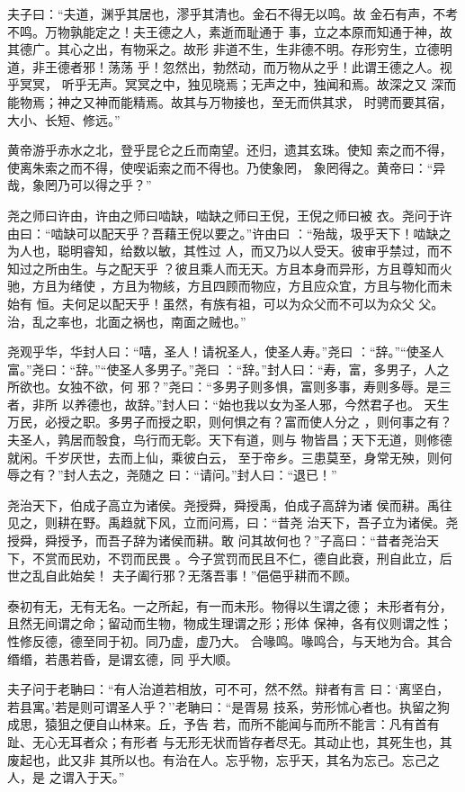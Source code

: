 \documentclass[]{article}
\begin{document}
夫子曰：``夫道，渊乎其居也，漻乎其清也。金石不得无以鸣。故
金石有声，不考不鸣。万物孰能定之！夫王德之人，素逝而耻通于
事，立之本原而知通于神，故其德广。其心之出，有物采之。故形
非道不生，生非德不明。存形穷生，立德明道，非王德者邪！荡荡
乎！忽然出，勃然动，而万物从之乎！此谓王德之人。视乎冥冥，
听乎无声。冥冥之中，独见晓焉；无声之中，独闻和焉。故深之又
深而能物焉；神之又神而能精焉。故其与万物接也，至无而供其求，
时骋而要其宿，大小、长短、修远。''

黄帝游乎赤水之北，登乎昆仑之丘而南望。还归，遗其玄珠。使知
索之而不得，使离朱索之而不得，使喫诟索之而不得也。乃使象罔，
象罔得之。黄帝曰：``异哉，象罔乃可以得之乎？''

尧之师曰许由，许由之师曰啮缺，啮缺之师曰王倪，王倪之师曰被
衣。尧问于许由曰：``啮缺可以配天乎？吾藉王倪以要之。''许由曰
：``殆哉，圾乎天下！啮缺之为人也，聪明睿知，给数以敏，其性过
人，而又乃以人受天。彼审乎禁过，而不知过之所由生。与之配天乎
？彼且乘人而无天。方且本身而异形，方且尊知而火驰，方且为绪使
，方且为物絯，方且四顾而物应，方且应众宜，方且与物化而未始有
恒。夫何足以配天乎！虽然，有族有祖，可以为众父而不可以为众父
父。治，乱之率也，北面之祸也，南面之贼也。''

尧观乎华，华封人曰：``嘻，圣人！请祝圣人，使圣人寿。''尧曰
：``辞。''``使圣人富。''尧曰：``辞。''``使圣人多男子。''尧曰
：``辞。''封人曰：``寿，富，多男子，人之所欲也。女独不欲，何
邪？''尧曰：``多男子则多惧，富则多事，寿则多辱。是三者，非所
以养德也，故辞。''封人曰：``始也我以女为圣人邪，今然君子也。
天生万民，必授之职。多男子而授之职，则何惧之有？富而使人分之
，则何事之有？夫圣人，鹑居而彀食，鸟行而无彰。天下有道，则与
物皆昌；天下无道，则修德就闲。千岁厌世，去而上仙，乘彼白云，
至于帝乡。三患莫至，身常无殃，则何辱之有？''封人去之，尧随之
曰：``请问。''封人曰：``退已！''

尧治天下，伯成子高立为诸侯。尧授舜，舜授禹，伯成子高辞为诸
侯而耕。禹往见之，则耕在野。禹趋就下风，立而问焉，曰：``昔尧
治天下，吾子立为诸侯。尧授舜，舜授予，而吾子辞为诸侯而耕。敢
问其故何也？''子高曰：``昔者尧治天下，不赏而民劝，不罚而民畏
。今子赏罚而民且不仁，德自此衰，刑自此立，后世之乱自此始矣！
夫子阖行邪？无落吾事！''俋俋乎耕而不顾。

泰初有无，无有无名。一之所起，有一而未形。物得以生谓之德；
未形者有分，且然无间谓之命；留动而生物，物成生理谓之形；形体
保神，各有仪则谓之性；性修反德，德至同于初。同乃虚，虚乃大。
合喙鸣。喙鸣合，与天地为合。其合缗缗，若愚若昏，是谓玄德，同 乎大顺。

夫子问于老聃曰：``有人治道若相放，可不可，然不然。辩者有言
曰：`离坚白，若县寓。'若是则可谓圣人乎？''老聃曰：``是胥易
技系，劳形怵心者也。执留之狗成思，猿狙之便自山林来。丘，予告
若，而所不能闻与而所不能言：凡有首有趾、无心无耳者众；有形者
与无形无状而皆存者尽无。其动止也，其死生也，其废起也，此又非
其所以也。有治在人。忘乎物，忘乎天，其名为忘己。忘己之人，是
之谓入于天。''
\end{document}
